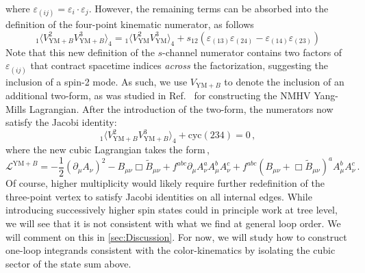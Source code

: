 \documentclass[11pt,letter]{article}
\begin{document}
where $ \varepsilon_{(ij)} = \varepsilon_{i}\cdot \varepsilon_{j}$.
However, the remaining terms can be absorbed into the definition of the
four-point kinematic numerator, as follows
\begin{equation}
{}_1\langle V^{2}_{\text{YM}+B}V^{3}_{\text{YM}+B}\rangle_4 = {}_1\langle V^{2}_{\text{YM}}V^{3}_{\text{YM}}\rangle_4 + s_{12} (\varepsilon_{(13)}\varepsilon_{(24)}-\varepsilon_{(14)}\varepsilon_{(23)})
\end{equation}
Note that this new definition of the $s$-channel numerator contains two factors of $\varepsilon_{(ij)} $ that contract spacetime indices \textit{across} the factorization, suggesting the inclusion of a spin-2 mode. As such, we use $V_{\text{YM}+B}$ to denote the inclusion of an additional two-form, as was studied in Ref.~\cite{Ben-Shahar:2022ixa} for constructing the NMHV Yang-Mills Lagrangian.  After the introduction of the two-form, the
numerators now satisfy the Jacobi identity:
\begin{equation}
  {}_1\langle
  V^{2}_{\text{YM}+B}V^{3}_{\text{YM}+B}\rangle_4+\text{cyc}(234) =0\,,
\end{equation}
where the new cubic Lagrangian takes the form\,,
\begin{equation}
\mathcal{L}^{\text{YM}+B} = -\frac{1}{2}(\partial_\mu A_\nu)^2 -
B_{\mu\nu}\Box\tilde{B}_{\mu\nu}+ f^{abc} \partial_\mu A^a_\nu A^b_\mu
A^c_\nu+ f^{abc} (B_{\mu\nu}+\Box \tilde{B}_{\mu\nu})^a A^b_\mu
A^c_\nu\, .
\end{equation}
Of course, higher multiplicity would likely require further redefinition of
the three-point vertex to satisfy Jacobi identities on all internal
edges. While introducing successively higher spin states could in
principle work at tree level, we will see that it is not consistent
with what we find at general loop order. We will comment on this in
\cref{sec:Discussion}. For
now, we will study how to construct one-loop integrands consistent
with the color-kinematics by isolating the cubic sector of the state
sum above.
\end{document}
